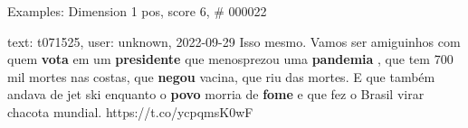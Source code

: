 \begin{frame}{Examples: Dimension 1 pos, score 6, \# 000022}
\footnotesize
\begin{exampleblock}{text: t071525, user: unknown, 2022-09-29}
Isso mesmo. Vamos ser amiguinhos com quem \textbf{vota} em um 
\textbf{presidente} que menosprezou uma \textbf{pandemia} , que tem 700 mil 
mortes nas costas, que \textbf{negou} vacina, que riu das mortes. E que também 
andava de jet ski enquanto o \textbf{povo} morria de \textbf{fome} e que fez o 
Brasil virar chacota mundial. https://t.co/ycpqmsK0wF 
\end{exampleblock}
\end{frame}
